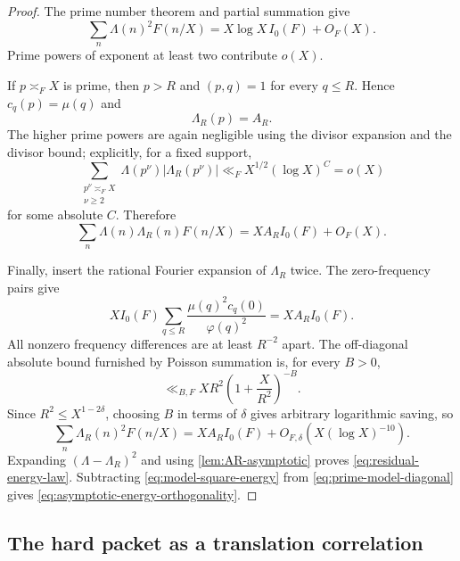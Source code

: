 \begin{proof}
The prime number theorem and partial summation give
\begin{equation}
 \sum_n\Lambda(n)^2F(n/X)
 =X\log X\,I_0(F)+O_F(X).
 \label{eq:Lambda-square-energy}
\end{equation}
Prime powers of exponent at least two contribute $o(X)$.

If $p\asymp_FX$ is prime, then $p>R$ and $(p,q)=1$ for every $q\le R$.
Hence $c_q(p)=\mu(q)$ and
\begin{equation}
 \Lambda_R(p)=A_R.
 \label{eq:model-on-large-primes}
\end{equation}
The higher prime powers are again negligible using the divisor expansion
and the divisor bound; explicitly, for a fixed support,
\[
 \sum_{\substack{p^\nu\asymp_FX\\\nu\ge2}}
 \Lambda(p^\nu)|\Lambda_R(p^\nu)|
 \ll_F X^{1/2}(\log X)^C=o(X)
\]
for some absolute $C$.  Therefore
\begin{equation}
 \sum_n\Lambda(n)\Lambda_R(n)F(n/X)
 =XA_RI_0(F)+O_F(X).
 \label{eq:prime-model-diagonal}
\end{equation}

Finally, insert the rational Fourier expansion of $\Lambda_R$ twice.
The zero-frequency pairs give
\[
 XI_0(F)\sum_{q\le R}
 \frac{\mu(q)^2c_q(0)}{\varphi(q)^2}
 =XA_RI_0(F).
\]
All nonzero frequency differences are at least $R^{-2}$ apart.  The
off-diagonal absolute bound furnished by Poisson summation is, for every
$B>0$,
\[
 \ll_{B,F}XR^2\left(1+\frac X{R^2}\right)^{-B}.
\]
Since $R^2\le X^{1-2\delta}$, choosing $B$ in terms of $\delta$ gives
arbitrary logarithmic saving, so
\begin{equation}
 \sum_n\Lambda_R(n)^2F(n/X)
 =XA_RI_0(F)+O_{F,\delta}(X(\log X)^{-10}).
 \label{eq:model-square-energy}
\end{equation}
Expanding $(\Lambda-\Lambda_R)^2$ and using
\cref{lem:AR-asymptotic} proves \eqref{eq:residual-energy-law}.
Subtracting \eqref{eq:model-square-energy} from
\eqref{eq:prime-model-diagonal} gives
\eqref{eq:asymptotic-energy-orthogonality}.
\end{proof}

\subsection{The hard packet as a translation correlation}

